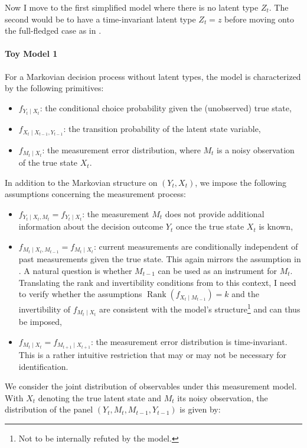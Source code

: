 \documentclass[12pt]{article}
\begin{document}
Now I move to the first simplified model where there is no latent type $ Z_t$. The second would be to have a time-invariant latent type $Z_t=z$ before moving onto the full-fledged case as in \citet{todd2020dynamic}.

\paragraph{Toy Model 1} For a Markovian decision process without latent types, the model is characterized by the following primitives:
\begin{itemize}
    \item $f_{Y_t \mid X_t}$: the conditional choice probability given the (unobserved) true state,
    \item $f_{X_t \mid X_{t-1}, Y_{t-1}}$: the transition probability of the latent state variable,
    \item $f_{M_t \mid X_t}$: the measurement error distribution, where $M_t$ is a noisy observation of the true state $X_t$.
\end{itemize}

In addition to the Markovian structure on $(Y_t, X_t)$, we impose the following assumptions concerning the measurement process:
\begin{itemize}
    \item $f_{Y_t \mid X_t, M_t} = f_{Y_t \mid X_t}$: the measurement $M_t$ does not provide additional information about the decision outcome $Y_t$ once the true state $X_t$ is known,
    \item $f_{M_t \mid X_t, M_{t-1}} = f_{M_t \mid X_t}$: current measurements are conditionally independent of past measurements given the true state. This again mirrors the assumption in \citet{hu2008identification}. A natural question is whether $M_{t-1}$ can be used as an instrument for $M_t$. Translating the rank and invertibility conditions from \citet{hu2008identification} to this context, I need to verify whether the assumptions $\operatorname{Rank}(f_{X_t \mid M_{t-1}}) = k$ and the invertibility of $f_{M_t \mid X_t}$ are consistent with the model’s structure\footnote{Not to be internally refuted by the model.} and can thus be imposed,
    \item $f_{M_t \mid X_t} = f_{M_{t+1} \mid X_{t+1}}$: the measurement error distribution is time-invariant. This is a rather intuitive restriction that may or may not be necessary for identification.
\end{itemize}

We consider the joint distribution of observables under this measurement model. With $X_t$ denoting the true latent state and $M_t$ its noisy observation, the distribution of the panel $(Y_t, M_t, M_{t-1}, Y_{t-1})$ is given by:
\end{document}

